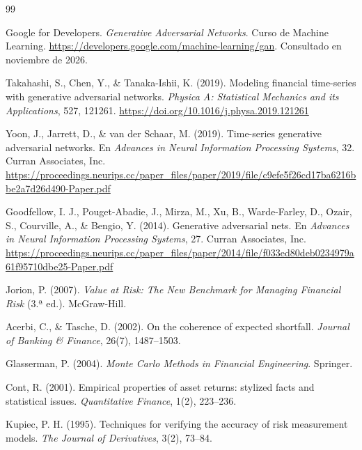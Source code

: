 \documentclass[12pt,letterpaper]{article}
\begin{document}
\bigskip
{}
\begin{thebibliography}{99}
\setlength{\itemsep}{2pt}
\footnotesize

 Google for Developers. \emph{Generative Adversarial Networks}. Curso de Machine Learning. \url{https://developers.google.com/machine-learning/gan}. Consultado en noviembre de 2026.

 Takahashi, S., Chen, Y., \& Tanaka-Ishii, K. (2019). Modeling financial time-series with generative adversarial networks. \emph{Physica A: Statistical Mechanics and its Applications}, 527, 121261. \url{https://doi.org/10.1016/j.physa.2019.121261}

 Yoon, J., Jarrett, D., \& van der Schaar, M. (2019). Time-series generative adversarial networks. En \emph{Advances in Neural Information Processing Systems}, 32. Curran Associates, Inc. \url{https://proceedings.neurips.cc/paper_files/paper/2019/file/c9efe5f26cd17ba6216bbe2a7d26d490-Paper.pdf}

 Goodfellow, I. J., Pouget-Abadie, J., Mirza, M., Xu, B., Warde-Farley, D., Ozair, S., Courville, A., \& Bengio, Y. (2014). Generative adversarial nets. En \emph{Advances in Neural Information Processing Systems}, 27. Curran Associates, Inc. \url{https://proceedings.neurips.cc/paper_files/paper/2014/file/f033ed80deb0234979a61f95710dbe25-Paper.pdf}

 Jorion, P. (2007). \emph{Value at Risk: The New Benchmark for Managing Financial Risk} (3.ª ed.). McGraw-Hill.

 Acerbi, C., \& Tasche, D. (2002). On the coherence of expected shortfall. \emph{Journal of Banking \& Finance}, 26(7), 1487--1503.

 Glasserman, P. (2004). \emph{Monte Carlo Methods in Financial Engineering}. Springer.

 Cont, R. (2001). Empirical properties of asset returns: stylized facts and statistical issues. \emph{Quantitative Finance}, 1(2), 223--236.

 Kupiec, P. H. (1995). Techniques for verifying the accuracy of risk measurement models. \emph{The Journal of Derivatives}, 3(2), 73--84.


\end{thebibliography}
\end{document}
